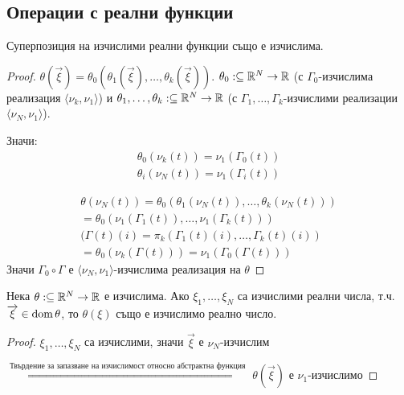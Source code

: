 \subsection{Операции с реални функции}
\begin{proposition}
    Суперпозиция на изчислими реални функции също е изчислима.
\end{proposition}
\begin{proof}
    $\theta(\overrightarrow\xi) = \theta_0(\theta_1(\overrightarrow\xi), \dots, \theta_k(\overrightarrow\xi))$. $\theta_0:\subseteq {\mathbb{R}}^N \to {\mathbb{R}}$ (с $\Gamma_0$-изчислима реализация $\langle\nu_k, \nu_1\rangle$) и $\theta_1, \dots, \theta_k: \subseteq {\mathbb{R}}^N \to {\mathbb{R}}$ (с $\Gamma_1, \dots, \Gamma_k$-изчислими реализации $\langle\nu_N, \nu_1\rangle$).

    Значи:
    \begin{equation}
        \begin{split}
            \theta_0(\nu_k(t)) = \nu_1(\Gamma_0(t)) \\
            \theta_i(\nu_N(t)) = \nu_1(\Gamma_i(t))            
        \end{split}
    \end{equation}

    \begin{equation}
        \begin{split}
            \theta(\nu_N(t)) = \theta_0(\theta_1(\nu_N(t)), \dots, \theta_k(\nu_N(t))) \\
            = \theta_0( \nu_1(\Gamma_1(t)), \dots, \nu_1(\Gamma_k(t)) ) \\
            (\Gamma(t)(i) = \pi_k( \Gamma_1(t)(i), \dots, \Gamma_k(t)(i) ) \\
            = \theta_0(\nu_k(\Gamma(t))) = \nu_1(\Gamma_0(\Gamma(t)))
        \end{split}
    \end{equation}
    Значи $\Gamma_0 \circ \Gamma$ е $\langle \nu_N, \nu_1 \rangle$-изчислима реализация на $\theta$
\end{proof}

\begin{proposition}
    Нека $\theta: \subseteq {\mathbb{R}}^N \to {\mathbb{R}}$ е изчислима. Ако $\xi_1, \dots, \xi_N$ са изчислими реални числа, т.ч. $\overrightarrow\xi \in \operatorname*{dom}\theta$, то $\theta(\xi)$ също е изчислимо реално число.
\end{proposition}
\begin{proof}
    $\xi_1, \dots, \xi_N$ са изчислими, значи $\overrightarrow\xi$ е $\nu_N$-изчислим 
    
    $\overset{\text{Твърдение за запазване на изчислимост относно абстрактна функция}}{\Rightarrow}$ $\theta(\overrightarrow\xi)$ е $\nu_1$-изчислимо
\end{proof}

